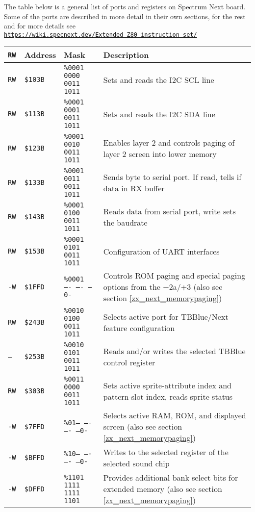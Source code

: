 \documentclass[twoside,openright,a4paper]{book}
\newcommand{\notet}{\rule{0pt}{2.4ex}}
\begin{document}
The table below is a general list of ports and registers on Spectrum Next board. Some of the ports are described in more detail in their own sections, for the rest and for more details see \\
{\tt \url{https://wiki.specnext.dev/Extended_Z80_instruction_set/}}

\newcommand{\zxport}[4]{\tt {#1}\notet & {\tt \$#2} & {\tt \%#3} & #4}

\begin{tabular}{lllp{7.5cm}}
	{\tt RW} & Address & Mask & Description \\
	
	\hline
	
	\zxport{RW}{103B}{0001 0000 0011 1011}{Sets and reads the I2C SCL line} \\
	\zxport{RW}{113B}{0001 0001 0011 1011}{Sets and reads the I2C SDA line} \\
	\zxport{RW }{123B}{0001 0010 0011 1011}{Enables layer 2 and controls paging of layer 2 screen into lower memory} \\
	\zxport{RW}{133B}{0001 0011 0011 1011}{Sends byte to serial port. If read, tells if data in RX buffer} \\
	\zxport{RW}{143B}{0001 0100 0011 1011}{Reads data from serial port, write sets the baudrate} \\
	\zxport{RW}{153B}{0001 0101 0011 1011}{Configuration of UART interfaces} \\
	\zxport{-W}{1FFD}{0001 ---- ---- --0-}{Controls ROM paging and special paging options from the +2a/+3 (also see section \ref{zx_next_memorypaging})} \\
	\zxport{RW}{243B}{0010 0100 0011 1011}{Selects active port for TBBlue/Next feature configuration} \\
	\zxport{--}{253B}{0010 0101 0011 1011}{Reads and/or writes the selected TBBlue control register} \\
	\zxport{RW}{303B}{0011 0000 0011 1011}{Sets active sprite-attribute index and pattern-slot index, reads sprite status} \\
	\zxport{-W}{7FFD}{01-- ---- ---- --0-}{Selects active RAM, ROM, and displayed screen (also see section \ref{zx_next_memorypaging})} \\
	\zxport{-W}{BFFD}{10-- ---- ---- --0-}{Writes to the selected register of the selected sound chip} \\
	\zxport{-W}{DFFD}{1101 1111 1111 1101}{Provides additional bank select bits for extended memory (also see section \ref{zx_next_memorypaging})} \\

\end{tabular}
\end{document}
